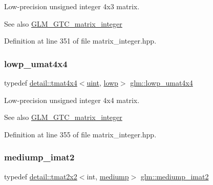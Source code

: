 Low-\/precision unsigned integer 4x3 matrix. \begin{DoxySeeAlso}{See also}
\hyperlink{group__gtc__matrix__integer}{G\+L\+M\+\_\+\+G\+T\+C\+\_\+matrix\+\_\+integer} 
\end{DoxySeeAlso}


Definition at line 351 of file matrix\+\_\+integer.\+hpp.

\mbox{\label{group__gtc__matrix__integer_ga394ee910348beffe9c7d6b694d5efe5f}} 
\subsubsection{\texorpdfstring{lowp\+\_\+umat4x4}{lowp\_umat4x4}}
{\footnotesize\ttfamily typedef \hyperlink{structglm_1_1detail_1_1tmat4x4}{detail\+::tmat4x4}$<$\hyperlink{group__core__precision_ga4fd29415871152bfb5abd588334147c8}{uint}, \hyperlink{namespaceglm_a0f04f086094c747d227af4425893f545ae161af3fc695e696ce3bf69f7332bc2d}{lowp}$>$ \hyperlink{group__gtc__matrix__integer_ga394ee910348beffe9c7d6b694d5efe5f}{glm\+::lowp\+\_\+umat4x4}}

Low-\/precision unsigned integer 4x4 matrix. \begin{DoxySeeAlso}{See also}
\hyperlink{group__gtc__matrix__integer}{G\+L\+M\+\_\+\+G\+T\+C\+\_\+matrix\+\_\+integer} 
\end{DoxySeeAlso}


Definition at line 355 of file matrix\+\_\+integer.\+hpp.

\mbox{\label{group__gtc__matrix__integer_gaec03a8eef2ec2536f8bebffd0bac8192}} 
\subsubsection{\texorpdfstring{mediump\+\_\+imat2}{mediump\_imat2}}
{\footnotesize\ttfamily typedef \hyperlink{structglm_1_1detail_1_1tmat2x2}{detail\+::tmat2x2}$<$int, \hyperlink{namespaceglm_a0f04f086094c747d227af4425893f545a6416f3ea0c9025fb21ed50c4d6620482}{mediump}$>$ \hyperlink{group__gtc__matrix__integer_gaec03a8eef2ec2536f8bebffd0bac8192}{glm\+::mediump\+\_\+imat2}}

